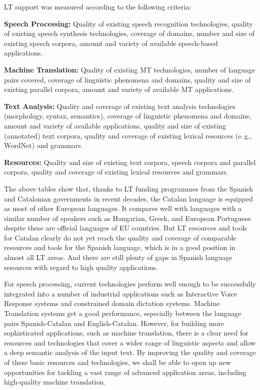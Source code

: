 \begin{multicols}{2}
LT support was measured according to the following criteria:

\textbf{Speech Processing:} Quality of existing speech recognition technologies, quality of existing speech synthesis technologies, coverage of domains, number and size of existing speech corpora, amount and variety of available speech-based applications.

\textbf{Machine Translation:} Quality of existing MT technologies, number of language pairs covered, coverage of linguistic phenomena and domains, quality and size of existing parallel corpora, amount and variety of available MT applications.

\textbf{Text Analysis:} Quality and coverage of existing text analysis technologies (morphology, syntax, semantics), coverage of linguistic phenomena and domains, amount and variety of available applications, quality and size of existing (annotated) text corpora, quality and coverage of existing lexical resources (e.\,g., WordNet) and grammars.

\textbf{Resources:} Quality and size of existing text corpora, speech corpora and parallel corpora, quality and coverage of existing lexical resources and grammars.

The above tables show that, thanks to LT funding programmes from the Spanish and Catalonian governments in recent decades, the Catalan language is equipped as most of other European languages. It compares well with languages with a similar number of speakers such as Hungarian, Greek, and European Portuguese despite these are official languages of EU countries. But LT resources and tools for Catalan clearly do not yet reach the quality and coverage of comparable resources and tools for the Spanish language, which is in a good position in almost all LT areas. And there are still plenty of gaps in Spanish language resources with regard to high quality applications.

For speech processing, current technologies perform well enough to be successfully integrated into a number of industrial applications such as Interactive Voice Response systems and constrained domain dictation systems. Machine Translation systems get a good performance, especially between the language pairs Spanish-Catalan and English-Catalan. However, for building more sophisticated applications, such as machine translation, there is a clear need for resources and technologies that cover a wider range of linguistic aspects and allow a deep semantic analysis of the input text. By improving the quality and coverage of these basic resources and technologies, we shall be able to open up new opportunities for tackling a vast range of advanced application areas, including high-quality machine translation.  


\end{multicols}
